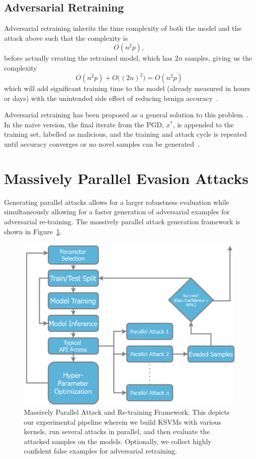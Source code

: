 \documentclass[fonts]{icst}
\begin{document}
\subsection{Adversarial Retraining}
\label{retrain}
Adversarial retraining inherits the time complexity of both the model and the attack above such that the complexity is
$$
    O(n^2p),
$$
before actually creating the retrained model, which has $2n$ samples, giving us the complexity
$$
    O(n^2p) + O\big((2n)^2\big) = O(n^2p)
$$
which will add significant training time to the model (already measured in hours or days) with the unintended side effect of reducing benign accuracy~\cite{stutz2019confidence}.

Adversarial retraining has been proposed as a general solution to this problem~\cite{li2016general,stutz2019confidence}. In the naive version, the final iterate from the PGD, $x^{*}$, is appended to the training set, labelled as malicious, and the training and attack cycle is repeated until accuracy converges or no novel samples can be generated~\cite{li2016general}.

\section{Massively Parallel Evasion Attacks}


Generating parallel attacks allows for a larger robustness evaluation while simultaneously allowing for a faster generation of adversarial examples for adversarial re-training. The massively parallel attack generation framework is shown in Figure~\ref{fig:attack_framework}.


\begin{figure}[!htb]
\centering
\includegraphics[width=.7\textwidth]{./ppgd.png}
\caption{Massively Parallel Attack and Re-training Framework.  This depicts our experimental pipeline wherein we build KSVMs with various kernels, run several attacks in parallel, and then evaluate the attacked samples on the models. Optionally, we collect highly confident false examples for adversarial retraining.}
\label{fig:attack_framework}

\end{figure}
\end{document}
